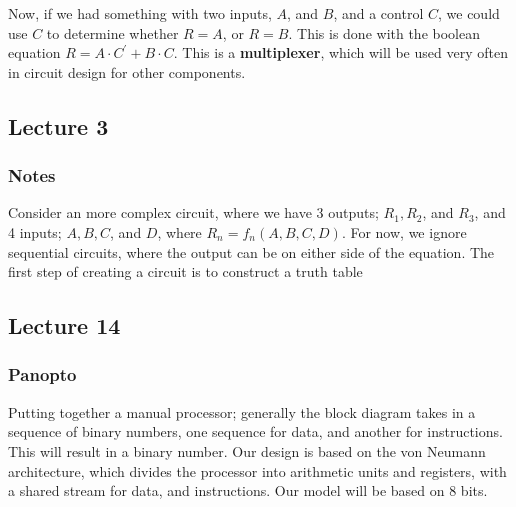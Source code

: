 \documentclass[a4paper, 12pt]{article}
\begin{document}
                Now, if we had something with two inputs, $A$, and $B$, and a control $C$, we could use $C$ to determine whether $R = A$, or $R = B$. This is done with the boolean equation $R = A \cdot C^\prime + B \cdot C$. This is a \textbf{multiplexer}, which will be used very often in circuit design for other components.
        \subsection*{Lecture 3}
            \subsubsection*{Notes}
                Consider an more complex circuit, where we have 3 outputs; $R_1, R_2$, and $R_3$, and 4 inputs; $A, B, C$, and $D$, where $R_n=f_n(A, B, C, D)$. For now, we ignore sequential circuits, where the output can be on either side of the equation. The first step of creating a circuit is to construct a truth table
        \subsection*{Lecture 14}
            \subsubsection*{Panopto}
                Putting together a manual processor; generally the block diagram takes in a sequence of binary numbers, one sequence for data, and another for instructions. This will result in a binary number. Our design is based on the von Neumann architecture, which divides the processor into arithmetic units and registers, with a shared stream for data, and instructions. Our model will be based on 8 bits.
                \medskip
\end{document}
